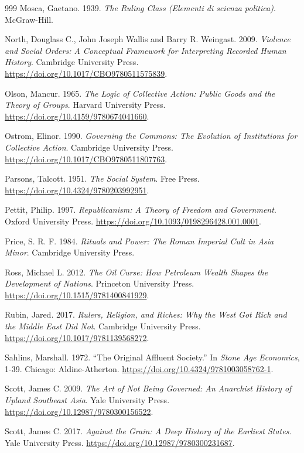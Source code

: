 \documentclass[11pt,letterpaper]{article}
\theoremstyle{definition}
\theoremstyle{remark}
\begin{document}
\begin{small}
\begin{thebibliography}{999}
Mosca, Gaetano. 1939. \emph{The Ruling Class (Elementi di scienza politica)}. McGraw-Hill.

North, Douglass C., John Joseph Wallis and Barry R. Weingast. 2009. \emph{Violence and Social Orders: A Conceptual Framework for Interpreting Recorded Human History}. Cambridge University Press. \url{https://doi.org/10.1017/CBO9780511575839}.

Olson, Mancur. 1965. \emph{The Logic of Collective Action: Public Goods and the Theory of Groups}. Harvard University Press. \url{https://doi.org/10.4159/9780674041660}.

Ostrom, Elinor. 1990. \emph{Governing the Commons: The Evolution of Institutions for Collective Action}. Cambridge University Press. \url{https://doi.org/10.1017/CBO9780511807763}.

Parsons, Talcott. 1951. \emph{The Social System}. Free Press. \url{https://doi.org/10.4324/9780203992951}.

Pettit, Philip. 1997. \emph{Republicanism: A Theory of Freedom and Government}. Oxford University Press. \url{https://doi.org/10.1093/0198296428.001.0001}.

Price, S. R. F. 1984. \emph{Rituals and Power: The Roman Imperial Cult in Asia Minor}. Cambridge University Press.

Ross, Michael L. 2012. \emph{The Oil Curse: How Petroleum Wealth Shapes the Development of Nations}. Princeton University Press. \url{https://doi.org/10.1515/9781400841929}.

Rubin, Jared. 2017. \emph{Rulers, Religion, and Riches: Why the West Got Rich and the Middle East Did Not}. Cambridge University Press. \url{https://doi.org/10.1017/9781139568272}.

Sahlins, Marshall. 1972. ``The Original Affluent Society.'' In \emph{Stone Age Economics}, 1-39. Chicago: Aldine-Atherton. \url{https://doi.org/10.4324/9781003058762-1}.

Scott, James C. 2009. \emph{The Art of Not Being Governed: An Anarchist History of Upland Southeast Asia}. Yale University Press. \url{https://doi.org/10.12987/9780300156522}.

Scott, James C. 2017. \emph{Against the Grain: A Deep History of the Earliest States}. Yale University Press. \url{https://doi.org/10.12987/9780300231687}.


\end{thebibliography}
\end{small}
\end{document}
